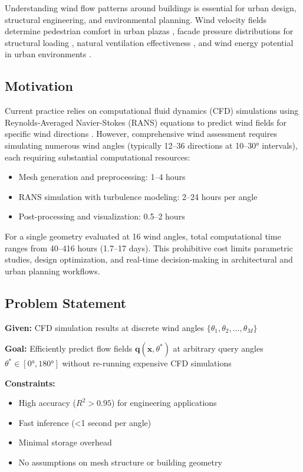\documentclass[conference]{IEEEtran}
\begin{document}
Understanding wind flow patterns around buildings is essential for urban design, structural engineering, and environmental planning. Wind velocity fields determine pedestrian comfort in urban plazas \cite{blocken2011}, facade pressure distributions for structural loading \cite{tominaga2008}, natural ventilation effectiveness \cite{chen2009}, and wind energy potential in urban environments \cite{stathopoulos2007}.

\subsection{Motivation}

Current practice relies on computational fluid dynamics (CFD) simulations using Reynolds-Averaged Navier-Stokes (RANS) equations to predict wind fields for specific wind directions \cite{franke2007}. However, comprehensive wind assessment requires simulating numerous wind angles (typically 12--36 directions at 10--30° intervals), each requiring substantial computational resources:
\begin{itemize}
    \item Mesh generation and preprocessing: 1--4 hours
    \item RANS simulation with turbulence modeling: 2--24 hours per angle
    \item Post-processing and visualization: 0.5--2 hours
\end{itemize}

For a single geometry evaluated at 16 wind angles, total computational time ranges from 40--416 hours (1.7--17 days). This prohibitive cost limits parametric studies, design optimization, and real-time decision-making in architectural and urban planning workflows.

\subsection{Problem Statement}

\textbf{Given:} CFD simulation results at discrete wind angles $\{\theta_1, \theta_2, \ldots, \theta_M\}$

\textbf{Goal:} Efficiently predict flow fields $\mathbf{q}(\mathbf{x}, \theta^*)$ at arbitrary query angles $\theta^* \in [0°, 180°]$ without re-running expensive CFD simulations

\textbf{Constraints:}
\begin{itemize}
    \item High accuracy ($R^2 > 0.95$) for engineering applications
    \item Fast inference (<1 second per angle)
    \item Minimal storage overhead
    \item No assumptions on mesh structure or building geometry
\end{itemize}
\end{document}
